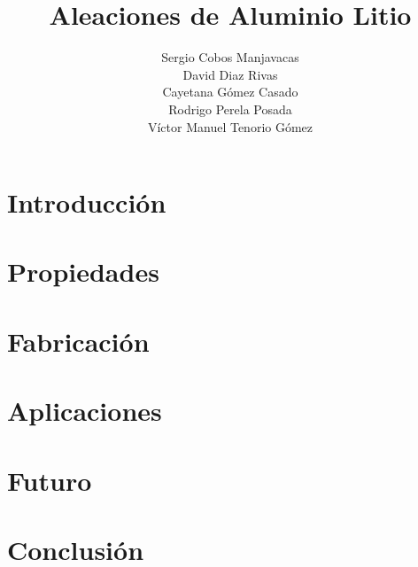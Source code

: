 \documentclass{article}
\author{Sergio Cobos Manjavacas \\
	David Diaz Rivas \\
	Cayetana G\'omez Casado \\
	Rodrigo Perela Posada \\
	V\'ictor Manuel Tenorio G\'omez
	}
\title{Aleaciones de Aluminio Litio}
\begin{document}
	
	\maketitle
	\newpage
	\tableofcontents
	
	\section{Introducción}
	
	\section{Propiedades}
	
	\section{Fabricación}
	
	\section{Aplicaciones}
	
	\section{Futuro}
	
	\section{Conclusión}
	
	
\end{document}
